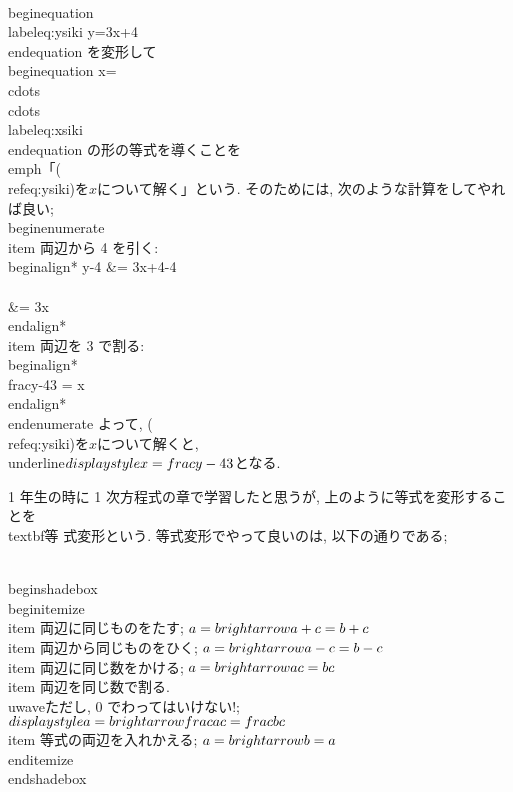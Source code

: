 \\begin{equation}\\label{eq:ysiki}
 y=3x+4
\\end{equation}
を変形して
\\begin{equation}
 x=\\cdots\\cdots\\label{eq:xsiki}
\\end{equation}
の形の等式を導くことを\\emph{「(\\ref{eq:ysiki})を$x$について解く」}という.
そのためには, 次のような計算をしてやれば良い;
\\begin{enumerate}
 \\item 両辺から 4 を引く:
       \\begin{align*}
	y-4 &= 3x+4-4 \\\\
	    &= 3x 
       \\end{align*}
 \\item 両辺を 3 で割る:
       \\begin{align*}
	\\frac{y-4}{3} = x
       \\end{align*} 
\\end{enumerate}
よって, (\\ref{eq:ysiki})を$x$について解くと, \\underline{$\\displaystyle
x=\\frac{y-4}{3}$}となる.

1 年生の時に 1 次方程式の章で学習したと思うが, 上のように等式を変形することを\\textbf{等
式変形}という. 等式変形でやって良いのは, 以下の通りである;

\\begin{shadebox}
 \\begin{itemize}
  \\item 両辺に同じものをたす; $a=b\\rightarrow a+c=b+c$
  \\item 両辺から同じものをひく; $a=b \\rightarrow a-c=b-c$
  \\item 両辺に同じ数をかける; $a=b \\rightarrow ac=bc$
  \\item 両辺を同じ数で割る. \\uwave{ただし, 0 でわってはいけない!};
	$\\displaystyle a=b\\rightarrow \\frac{a}{c}=\\frac{b}{c}$
  \\item 等式の両辺を入れかえる; $a=b \\rightarrow b=a$
 \\end{itemize}
\\end{shadebox}

